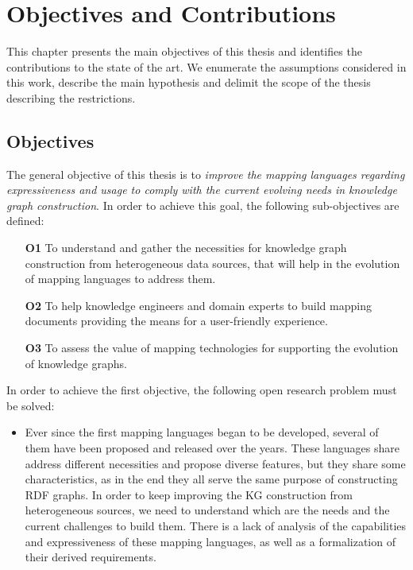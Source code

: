 \chapter{Objectives and Contributions}
\label{chapter:objectives}

This chapter presents the main objectives of this thesis and identifies the contributions to the state of the art. We enumerate the assumptions considered in this work, describe the main hypothesis and delimit the scope of the thesis describing the restrictions.

\section{Objectives}
\label{sec:chp3-objectives}

The general objective of this thesis is to \textit{improve the mapping languages regarding expressiveness and usage to comply with the current evolving needs in knowledge graph construction}. In order to achieve this goal, the following sub-objectives are defined:

\begin{enumerate}
    \item[\textbf{O1}] To understand and gather the necessities for knowledge graph construction from heterogeneous data sources, that will help in the evolution of mapping languages to address them. 
    \item[\textbf{O2}] To help knowledge engineers and domain experts to build mapping documents providing the means for a user-friendly experience.
    \item[\textbf{O3}] To assess the value of mapping technologies for supporting the evolution of knowledge graphs. 
\end{enumerate}

In order to achieve the first objective, the following open research problem must be solved:
\begin{itemize}
    \item Ever since the first mapping languages began to be developed, several of them have been proposed and released over the years. These languages share address different necessities and propose diverse features, but they share some characteristics, as in the end they all serve the same purpose of constructing RDF graphs. In order to keep improving the KG construction from heterogeneous sources, we need to understand which are the needs and the current challenges to build them. There is a lack of analysis of the capabilities and expressiveness of these mapping languages, as well as a formalization of their derived requirements. 
\end{itemize}

